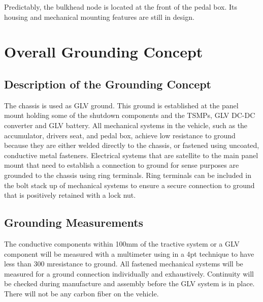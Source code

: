 \documentclass{article}
\begin{document}
{            Predictably, the bulkhead node is located at the front of the pedal box. Its housing and mechanical mounting features are still in design.

\newpage

\section{Overall Grounding Concept}

    \subsection{Description of the Grounding Concept}


        The chassis is used as GLV ground. This ground is established at the panel mount holding some of the shutdown components and the TSMPs, GLV DC-DC converter and GLV battery. All mechanical systems in the vehicle, such as the accumulator, drivers seat, and pedal box, achieve low resistance to ground because they are either welded directly to the chassis, or fastened using uncoated, conductive metal fasteners. Electrical systems that are satellite to the main panel mount that need to establish a connection to ground for sense purposes are grounded to the chassis using ring terminals. Ring terminals can be included in the bolt stack up of mechanical systems to ensure a secure connection to ground that is positively retained with a lock nut.


    \subsection{Grounding Measurements}

        The conductive components within 100mm of the tractive system or a GLV component will be measured with a multimeter using in a 4pt technique to have less than 300 m\ohm resistance to ground. All fastened mechanical systems will be measured for a ground connection individually and exhaustively. Continuity will be checked during manufacture and assembly before the GLV system is in place.\\

        There will not be any carbon fiber on the vehicle.

\newpage

}
\end{document}
